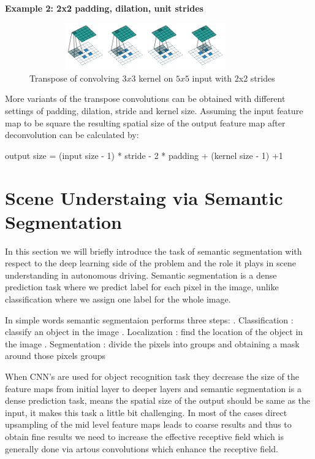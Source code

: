     \textbf{Example 2: 2x2 padding, dilation, unit strides}
     \begin{figure}[h]
    \centering
    \includegraphics[width=10cm, height =2cm]{images/transpose_case2.png}
    \caption{Transpose of convolving $3x3$ kernel on $5x5$ input with 2x2 strides \cite{https://doi.org/10.48550/arxiv.1603.07285}}
    \end{figure}
    
    More variants of the transpose convolutions can be obtained with different settings of padding, dilation, stride and kernel size. Assuming the input feature map to be square the resulting spatial size of the output feature map after deconvolution can be calculated by:
    
       \begin{center}\newline
       output size = (input size - 1) * stride - 2 * padding + (kernel size - 1) +1
   \end{center}
    

    \section{Scene Understaing via Semantic Segmentation}
    In this section we will briefly introduce the task of semantic segmentation with respect to the deep learning side of the problem and the role it plays in scene understanding in autonomous driving. Semantic segmentation is a dense prediction task where we predict label for each pixel in the image, unlike classification where we assign one label for the whole image.
    
    In simple words semantic segmentaion performs three steps: . Classification : classify an object in the image  . Localization : find the location of the object in the image . Segmentation : divide the pixels into groups and obtaining a mask around those pixels groups 
    
     When CNN's are used for object recognition task they decrease the size of the feature maps from initial layer to deeper layers and semantic segmentation is a dense prediction task, means the spatial size of the output should be same as the input, it makes this task a little bit challenging. In most of the cases direct upsampling of the mid level feature maps leads to coarse results and thus to obtain fine results we need to increase the effective receptive field which is generally done via artous convolutions which enhance the receptive field. 
     
